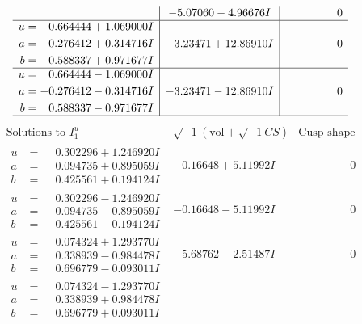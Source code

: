 \documentclass[1p]{elsarticle_modified}
\theoremstyle{definition}
\newcommand{\I}{\sqrt{-1}}
\begin{document}
$$\begin{array}{c|c|c}
 & -5.07060 - 4.96676 I & \phantom{-0.000000 } 0 \\ \hline\begin{aligned}
u &= \phantom{-}0.664444 + 1.069000 I \\
a &= -0.276412 + 0.314716 I \\
b &= \phantom{-}0.588337 + 0.971677 I\end{aligned}
 & -3.23471 + 12.86910 I & \phantom{-0.000000 } 0 \\ \hline\begin{aligned}
u &= \phantom{-}0.664444 - 1.069000 I \\
a &= -0.276412 - 0.314716 I \\
b &= \phantom{-}0.588337 - 0.971677 I\end{aligned}
 & -3.23471 - 12.86910 I & \phantom{-0.000000 } 0\\
 \hline 
 \end{array}$$\newpage$$\begin{array}{c|c|c}  
\text{Solutions to }I^u_{1}& \I (\text{vol} + \sqrt{-1}CS) & \text{Cusp shape}\\
 \hline 
\begin{aligned}
u &= \phantom{-}0.302296 + 1.246920 I \\
a &= \phantom{-}0.094735 + 0.895059 I \\
b &= \phantom{-}0.425561 + 0.194124 I\end{aligned}
 & -0.16648 + 5.11992 I & \phantom{-0.000000 } 0 \\ \hline\begin{aligned}
u &= \phantom{-}0.302296 - 1.246920 I \\
a &= \phantom{-}0.094735 - 0.895059 I \\
b &= \phantom{-}0.425561 - 0.194124 I\end{aligned}
 & -0.16648 - 5.11992 I & \phantom{-0.000000 } 0 \\ \hline\begin{aligned}
u &= \phantom{-}0.074324 + 1.293770 I \\
a &= \phantom{-}0.338939 - 0.984478 I \\
b &= \phantom{-}0.696779 - 0.093011 I\end{aligned}
 & -5.68762 - 2.51487 I & \phantom{-0.000000 } 0 \\ \hline\begin{aligned}
u &= \phantom{-}0.074324 - 1.293770 I \\
a &= \phantom{-}0.338939 + 0.984478 I \\
b &= \phantom{-}0.696779 + 0.093011 I\end{aligned}

\end{array}$$
\end{document}
